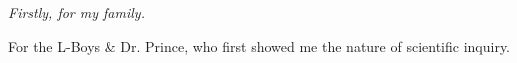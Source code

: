 {
\centering
\it Firstly, for my family.

For the L-Boys
& Dr. Prince, who first showed me the nature of scientific inquiry.
\par
}

\vspace{0.25\textheight}



